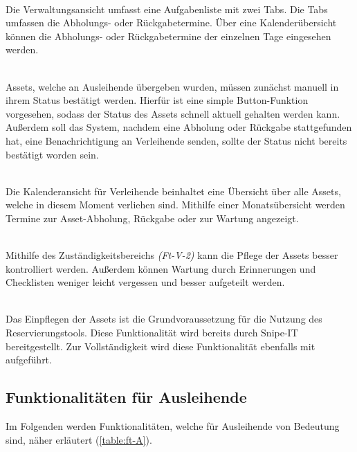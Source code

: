 {\sffamily\color{maincolor}{Ft-V-1 | Verwaltungsansicht }}\\
Die Verwaltungsansicht umfasst eine Aufgabenliste mit zwei Tabs. Die Tabs umfassen die Abholungs-
oder Rückgabetermine. Über eine Kalenderübersicht können die Abholungs- oder Rückgabetermine der
einzelnen Tage eingesehen werden.

    {\sffamily\color{maincolor}{Ft-V-2 | Bearbeiten des Assetstatus }}\\
Assets, welche an Ausleihende übergeben wurden, müssen zunächst manuell in ihrem
Status bestätigt werden. Hierfür ist eine simple Button-Funktion vorgesehen,
sodass der Status des Assets schnell aktuell gehalten werden kann. Außerdem soll
das System, nachdem eine Abholung oder Rückgabe stattgefunden hat, eine
Benachrichtigung an Verleihende senden, sollte der Status nicht bereits
bestätigt worden sein.

    {\sffamily\color{maincolor}{Ft-V-3 | Kalenderansicht für Verleihende}}\\
Die Kalenderansicht für Verleihende beinhaltet eine Übersicht über alle Assets,
welche in diesem Moment verliehen sind. Mithilfe einer Monatsübersicht werden
Termine zur Asset-Abholung, Rückgabe oder zur Wartung angezeigt.


    {\sffamily\color{maincolor}{Ft-V-4 | Pflege von Assets   }}\\
Mithilfe des Zuständigkeitsbereichs \textit{(Ft-V-2)} kann die Pflege der Assets
besser kontrolliert werden. Außerdem können Wartung durch Erinnerungen und Checklisten
weniger leicht vergessen und besser aufgeteilt werden.

    {\sffamily\color{maincolor}{Ft-V-5 | Pflege der Datenbank }}\\
Das Einpflegen der Assets ist die Grundvoraussetzung für die Nutzung des Reservierungstools. Diese
Funktionalität wird bereits durch Snipe-IT bereitgestellt. Zur Vollständigkeit wird diese
Funktionalität ebenfalls mit aufgeführt.

\subsection{Funktionalitäten für Ausleihende}
Im Folgenden werden Funktionalitäten, welche für Ausleihende von Bedeutung sind,
näher erläutert (\ref{table:ft-A}).

